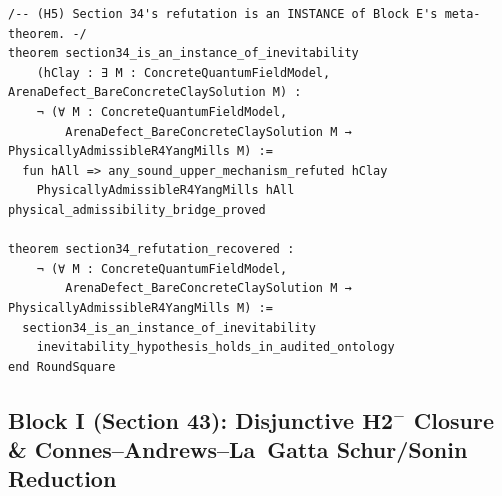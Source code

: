 \documentclass[11pt,a4paper]{article}
\theoremstyle{plain}
\theoremstyle{definition}
\theoremstyle{remark}
\renewcommand{\_}{\oldunderscore\allowbreak}
\begin{document}
\begin{lstlisting}
/-- (H5) Section 34's refutation is an INSTANCE of Block E's meta-theorem. -/
theorem section34_is_an_instance_of_inevitability
    (hClay : ∃ M : ConcreteQuantumFieldModel, ArenaDefect_BareConcreteClaySolution M) :
    ¬ (∀ M : ConcreteQuantumFieldModel,
        ArenaDefect_BareConcreteClaySolution M → PhysicallyAdmissibleR4YangMills M) :=
  fun hAll => any_sound_upper_mechanism_refuted hClay
    PhysicallyAdmissibleR4YangMills hAll physical_admissibility_bridge_proved

theorem section34_refutation_recovered :
    ¬ (∀ M : ConcreteQuantumFieldModel,
        ArenaDefect_BareConcreteClaySolution M → PhysicallyAdmissibleR4YangMills M) :=
  section34_is_an_instance_of_inevitability
    inevitability_hypothesis_holds_in_audited_ontology
end RoundSquare
\end{lstlisting}
\subsection{Block I (Section 43): Disjunctive \texorpdfstring{$\textbf{H2}^-$}{H2-} Closure \& Connes--Andrews--La~Gatta Schur/Sonin Reduction}
\end{document}
